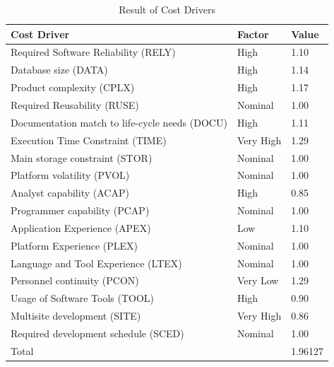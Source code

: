 \documentclass{article}
\begin{document}
\begin{table}[H]
	\centering
	\caption{Result of Cost Drivers}
	\label{my-label}
	\begin{tabular}{|l|l|l|}
		\hline
		Cost Driver & Factor & Value \\ \hline
		Required Software Reliability (RELY) & High & 1.10 \\ \hline
		Database size (DATA) & High & 1.14 \\ \hline
		Product complexity (CPLX) & High & 1.17 \\ \hline
		Required Reusability (RUSE) & Nominal & 1.00 \\ \hline
		Documentation match to life-cycle needs (DOCU) & High & 1.11 \\ \hline
		Execution Time Constraint (TIME) & Very High & 1.29 \\ \hline
		Main storage constraint (STOR) & Nominal & 1.00 \\ \hline
		Platform volatility (PVOL) & Nominal & 1.00 \\ \hline
		Analyst capability (ACAP) & High & 0.85 \\ \hline
		Programmer capability (PCAP) & Nominal & 1.00 \\ \hline
		Application Experience (APEX) & Low & 1.10 \\ \hline
		Platform Experience (PLEX) & Nominal & 1.00 \\ \hline
		Language and Tool Experience (LTEX) & Nominal & 1.00 \\ \hline
		Personnel continuity (PCON) & Very Low & 1.29 \\ \hline
		Usage of Software Tools (TOOL) & High & 0.90 \\ \hline
		Multisite development (SITE) & Very High & 0.86 \\ \hline
		Required development schedule (SCED) & Nominal & 1.00 \\ \hline
		\multicolumn{2}{|l|}{Total} & 1.96127 \\ \hline
	\end{tabular}
\end{table}

\newpage
\end{document}
